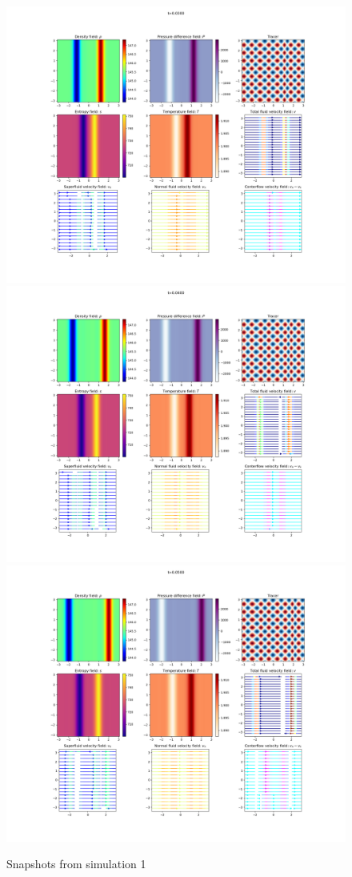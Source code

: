 \documentclass{article}
\begin{document}
\begin{figure}[h]
    \includegraphics[width=\textwidth/3]{Sim 1/SF01_0060.png}
    \includegraphics[width=\textwidth/3]{Sim 1/SF01_0080.png}
    \includegraphics[width=\textwidth/3]{Sim 1/SF01_0100.png}
    \caption{Snapshots from simulation 1}
    \label{sim1}
\end{figure}
\end{document}
